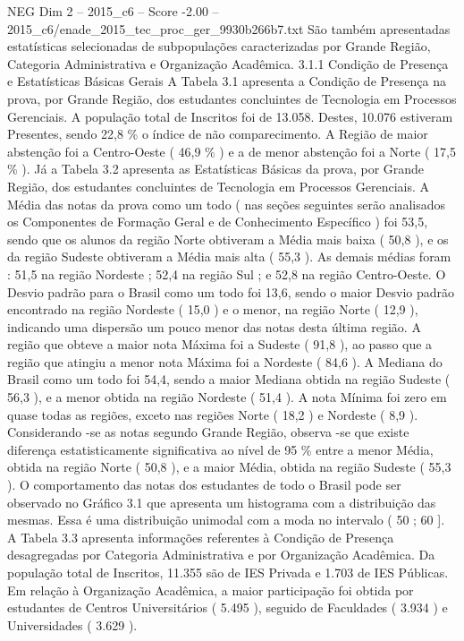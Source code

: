 \begin{textsample}{NEG Dim 2 – 2015\_c6 – Score -2.00 – 2015\_c6/enade\_2015\_tec\_proc\_ger\_9930b266b7.txt}
São também apresentadas estatísticas selecionadas de subpopulações caracterizadas por Grande Região, Categoria Administrativa e Organização Acadêmica. 3.1.1 Condição de Presença e Estatísticas Básicas Gerais A Tabela 3.1 apresenta a Condição de Presença na prova, por Grande Região, dos estudantes concluintes de Tecnologia em Processos Gerenciais.
A população total de Inscritos foi de 13.058.
Destes, 10.076 estiveram Presentes, sendo 22,8 \% o índice de não comparecimento.
A Região de maior abstenção foi a Centro-Oeste ( 46,9 \% ) e a de menor abstenção foi a Norte ( 17,5 \% ).
Já a Tabela 3.2 apresenta as Estatísticas Básicas da prova, por Grande Região, dos estudantes concluintes de Tecnologia em Processos Gerenciais.
A Média das notas da prova como um todo ( nas seções seguintes serão analisados os Componentes de Formação Geral e de Conhecimento Específico ) foi 53,5, sendo que os alunos da região Norte obtiveram a Média mais baixa ( 50,8 ), e os da região Sudeste obtiveram a Média mais alta ( 55,3 ).
As demais médias foram : 51,5 na região Nordeste ; 52,4 na região Sul ; e 52,8 na região Centro-Oeste.
O Desvio padrão para o Brasil como um todo foi 13,6, sendo o maior Desvio padrão encontrado na região Nordeste ( 15,0 ) e o menor, na região Norte ( 12,9 ), indicando uma dispersão um pouco menor das notas desta última região.
A região que obteve a maior nota Máxima foi a Sudeste ( 91,8 ), ao passo que a região que atingiu a menor nota Máxima foi a Nordeste ( 84,6 ).
A Mediana do Brasil como um todo foi 54,4, sendo a maior Mediana obtida na região Sudeste ( 56,3 ), e a menor obtida na região Nordeste ( 51,4 ).
A nota Mínima foi zero em quase todas as regiões, exceto nas regiões Norte ( 18,2 ) e Nordeste ( 8,9 ).
Considerando -se as notas segundo Grande Região, observa -se que existe diferença estatisticamente significativa ao nível de 95 \% entre a menor Média, obtida na região Norte ( 50,8 ), e a maior Média, obtida na região Sudeste ( 55,3 ).
O comportamento das notas dos estudantes de todo o Brasil pode ser observado no Gráfico 3.1 que apresenta um histograma com a distribuição das mesmas.
Essa é uma distribuição unimodal com a moda no intervalo ( 50 ; 60 ].
A Tabela 3.3 apresenta informações referentes à Condição de Presença desagregadas por Categoria Administrativa e por Organização Acadêmica.
Da população total de Inscritos, 11.355 são de IES Privada e 1.703 de IES Públicas.
Em relação à Organização Acadêmica, a maior participação foi obtida por estudantes de Centros Universitários ( 5.495 ), seguido de Faculdades ( 3.934 ) e Universidades ( 3.629 ).

\end{textsample}

